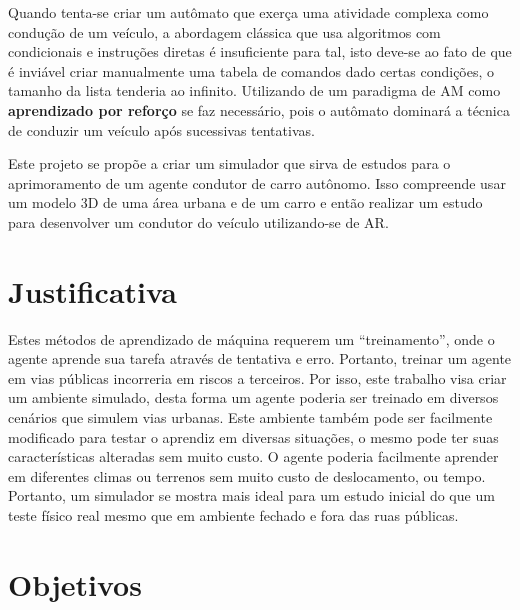Quando tenta-se criar um autômato que exerça uma atividade complexa como condução de um veículo, a abordagem clássica que usa algoritmos com condicionais e instruções diretas é insuficiente para tal, isto deve-se ao fato de que é inviável criar manualmente uma tabela de comandos dado certas condições, o tamanho da lista tenderia ao infinito. Utilizando de um paradigma de AM como \textbf{aprendizado por reforço} se faz necessário, pois o autômato dominará a técnica de conduzir um veículo após sucessivas tentativas.

Este projeto se propõe a criar um simulador que sirva de estudos para o aprimoramento de um agente condutor de carro autônomo. Isso compreende usar um modelo 3D de uma área urbana e de um carro e então realizar um estudo para desenvolver um condutor do veículo utilizando-se de AR.



\section*{Justificativa}\label{sec:justificativa}
Estes métodos de aprendizado de máquina requerem um ``treinamento'', onde o agente aprende sua tarefa através de tentativa e erro. Portanto, treinar um agente em vias públicas incorreria em riscos a terceiros. Por isso, este trabalho visa criar um ambiente simulado, desta forma um agente poderia ser treinado em diversos cenários que simulem vias urbanas. Este ambiente também pode ser facilmente modificado para testar o aprendiz em diversas situações, o mesmo pode ter suas características alteradas sem muito custo. O agente poderia facilmente aprender em diferentes climas ou terrenos sem muito custo de deslocamento, ou tempo. Portanto, um simulador se mostra mais ideal para um estudo inicial do que um teste físico real mesmo que em ambiente fechado e fora das ruas públicas.

\section*{Objetivos}\label{sec:objetivos}
